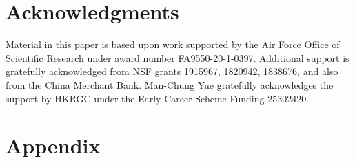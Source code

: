 \documentclass{article}
\begin{document}
    
    \section*{Acknowledgments}
    Material in this paper is based upon work supported by the Air Force Office of Scientific Research under award number FA9550-20-1-0397. Additional support is gratefully acknowledged from NSF grants 1915967, 1820942, 1838676, and also from the China Merchant Bank. Man-Chung Yue gratefully acknowledges the support by HKRGC under the Early Career Scheme Funding 25302420.
        


% 
% 
\appendix
	\renewcommand\thesection{\Alph{section}}
	\renewcommand{\theequation}{A.\arabic{equation}}
	\renewcommand{\thefigure}{A.\arabic{figure}}
	\renewcommand{\thetable}{A.\arabic{table}}
\onecolumn
\section{Appendix}
\end{document}
